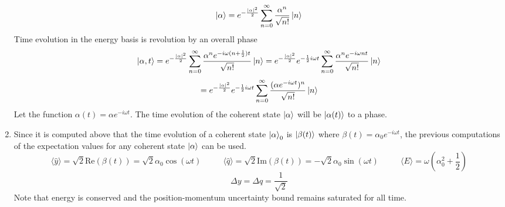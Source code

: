 \begin{sol}
\begin{enumerate}[label=\textbf{(\alph*)}]
$$\ket\alpha=e^{-\frac{|\alpha|^2}{2}}\sum_{n=0}^\infty \frac{\alpha^n }{\sqrt{n!}}\ket n$$
Time evolution in the energy basis is revolution by an overall phase
$$\ket{\alpha,t}=e^{-\frac{|\alpha|^2}{2}}\sum_{n=0}^\infty \frac{\alpha^ne^{-i\omega(n+\frac{1}{2} )t}}{\sqrt{n!}}\ket n=e^{-\frac{|\alpha|^2}{2}}e^{-\frac{1}{2}i\omega t}\sum_{n=0}^\infty \frac{\alpha^ne^{-i\omega nt}}{\sqrt{n!}}\ket n
$$$$=e^{-\frac{|\alpha|^2}{2}}e^{-\frac{1}{2}i\omega t}\sum_{n=0}^\infty \frac{(\alpha e^{-i\omega t})^n}{\sqrt{n!}}\ket n$$ 
Let the function $\alpha(t)=\alpha e^{-i\omega t}$. The time evolution of the coherent state $\ket\alpha$ will be $\ket{\alpha(t)}$ to a phase.
\item
Since it is computed above that the time evolution of a coherent state $\ket\alpha_0$ is $\ket{\beta(t)}$ where $\beta(t)=\alpha_0e^{-i\omega t}$, the previous computations of the expectation values for any coherent state $\ket\alpha$ can be used.
$$\langle\hat y\rangle=\sqrt{2}\text{Re}(\beta(t))=\sqrt{2}\alpha_0\cos(\omega t)\:\:\:\:\:\:\:\:\:\:\:\:\langle\hat q\rangle=\sqrt{2}\text{Im}(\beta(t))=-\sqrt{2}\alpha_0\sin(\omega t)\:\:\:\:\:\:\:\:\:\:\:\:\langle E\rangle = \omega\left(\alpha_0^2+\frac{1}{2}\right)$$
$$\Delta y = \Delta q = \frac{1}{\sqrt 2}$$
Note that energy is conserved and the position-momentum uncertainty bound remains saturated for all time.
\end{enumerate}
\end{sol}
